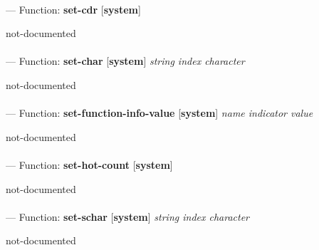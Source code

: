 \paragraph{}
\label{SYSTEM:SET-CDR}
--- Function: \textbf{set-cdr} [\textbf{system}] \textit{}

\begin{adjustwidth}{5em}{5em}
not-documented
\end{adjustwidth}

\paragraph{}
\label{SYSTEM:SET-CHAR}
--- Function: \textbf{set-char} [\textbf{system}] \textit{string index character}

\begin{adjustwidth}{5em}{5em}
not-documented
\end{adjustwidth}

\paragraph{}
\label{SYSTEM:SET-FUNCTION-INFO-VALUE}
--- Function: \textbf{set-function-info-value} [\textbf{system}] \textit{name indicator value}

\begin{adjustwidth}{5em}{5em}
not-documented
\end{adjustwidth}

\paragraph{}
\label{SYSTEM:SET-HOT-COUNT}
--- Function: \textbf{set-hot-count} [\textbf{system}] \textit{}

\begin{adjustwidth}{5em}{5em}
not-documented
\end{adjustwidth}

\paragraph{}
\label{SYSTEM:SET-SCHAR}
--- Function: \textbf{set-schar} [\textbf{system}] \textit{string index character}

\begin{adjustwidth}{5em}{5em}
not-documented
\end{adjustwidth}

